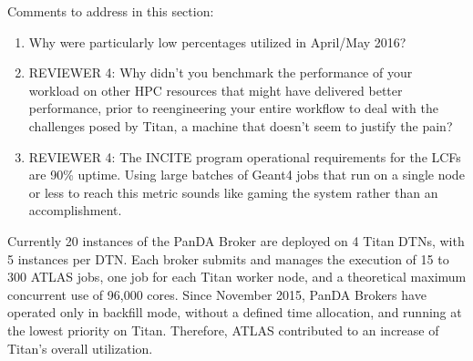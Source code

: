 \ifreview
Comments to address in this section:
\begin{enumerate}
    \item 
    Why were particularly low percentages utilized in April/May 2016?
    \item REVIEWER 4: Why didn’t you benchmark the performance of your
    workload on other HPC resources that might have delivered better
    performance, prior to reengineering your entire workflow to deal with the
    challenges posed by Titan, a machine that doesn’t seem to justify the
    pain?
    \item REVIEWER 4: The INCITE program operational requirements for the
    LCFs are 90\% uptime. Using large batches of Geant4 jobs that run on a
    single node or less to reach this metric sounds like gaming the system
    rather than an accomplishment.
\end{enumerate}
\fi

Currently 20 instances of the PanDA Broker are deployed on 4 Titan DTNs, with
5 instances per DTN\@. Each broker submits and manages the execution of 15 to
300 ATLAS jobs, one job for each Titan worker node, and a theoretical maximum
concurrent use of 96,000 cores. Since November 2015, PanDA Brokers have
operated only in backfill mode, without a defined time allocation, and running
at the lowest priority on Titan.  Therefore, ATLAS contributed to an increase
of Titan's overall utilization.

